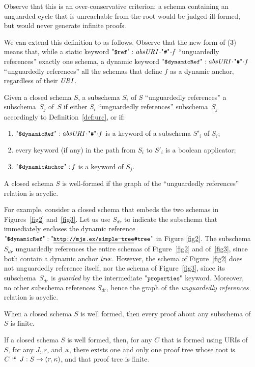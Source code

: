 Observe that this is an over-conservative criterion: a schema containing
an unguarded cycle that is unreachable from the root would be judged ill-formed,
but would never generate
infinite proofs.

We can extend this definition to {\mJS} as follows. Observe that the new form of (3) means that,
while a static keyword $\qdref :  \key{absURI}\catHash\key{f}$ ``unguardedly references'' exactly one schema, a dynamic
keyword $\qddref :  \key{absURI}\catHash\key{f}$ ``unguardedly references'' all the schemas that define $f$
as a dynamic anchor, regardless of their $\mathit{URI}$.


\begin{definition}
Given a closed {\mJS} schema $S$,
a subschema $S_i$ of $S$ ``unguardedly references'' a subschema~$S_j$ of~$S$ if either
$S_i$ ``unguardedly references'' subschema~$S_j$ accordingly to Definition~\ref{def:urc}, or if:
\begin{enumerate}
\item $\qddref :  \key{absURI}\catHash\key{f}$ is a keyword of a subschema $S'_i$ of $S_i$;
\item every keyword (if any) in the path from $S_i$ to $S'_i$ is a boolean applicator;
\item $\qdda : \key{f}$ is a keyword of $S_j$.
\end{enumerate}
A closed schema $S$ is well-formed if the graph of the ``unguardedly references'' relation is acyclic.
\end{definition}

For example, consider a closed schema that embeds the two schemas in Figures~\ref{fig2} and~\ref{fig3}.
Let us use $S_{dr}$ to indicate the subschema that immediately
encloses the dynamic reference $\qddref : \qkw{\underline{http://mjs.ex/simple-tree}\#tree}$ in Figure \ref{fig2}.
The subschema $S_{dr}$ unguardedly references
the entire schemas of Figure~\ref{fig2} and of~\ref{fig3},
since both contain a dynamic anchor $\mathit{tree}$. However, the schema
of Figure~\ref{fig2}
does not unguardedly reference itself, nor the schema of Figure~\ref{fig3},
since its subschema~$S_{dr}$ is \emph{guarded} by the intermediate $\qprops$ keyword.
Moreover, no other subschema references $S_{dr}$, hence the graph of the \emph{unguardedly
references} relation is acyclic.
 

When a closed schema $S$ is well formed, then every proof about any subschema of $S$ is finite.

\begin{theoremrep}[Termination]\label{the:termination}
If a closed schema $S$ is well formed, then, for any $C$ that is formed using URIs of $S$, 
for any $J$, $r$, and $\kappa$, there exists one and only one proof tree whose
root is $\SJudg{C}{J}{S}\Ret{r}(r,\ps)$, and that proof tree is finite.
\end{theoremrep}

